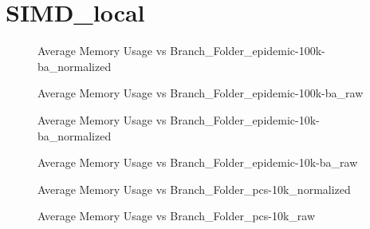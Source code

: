 \section{SIMD\_local}
\begin{figure}[H]
\centering

\caption{Average Memory Usage vs Branch\_Folder\_epidemic-100k-ba\_normalized}
\end{figure}
\vspace{1cm}
\begin{figure}[H]
\centering

\caption{Average Memory Usage vs Branch\_Folder\_epidemic-100k-ba\_raw}
\end{figure}
\vspace{1cm}
\newpage
\begin{figure}[H]
\centering

\caption{Average Memory Usage vs Branch\_Folder\_epidemic-10k-ba\_normalized}
\end{figure}
\vspace{1cm}
\begin{figure}[H]
\centering

\caption{Average Memory Usage vs Branch\_Folder\_epidemic-10k-ba\_raw}
\end{figure}
\vspace{1cm}
\newpage
\begin{figure}[H]
\centering

\caption{Average Memory Usage vs Branch\_Folder\_pcs-10k\_normalized}
\end{figure}
\vspace{1cm}
\begin{figure}[H]
\centering

\caption{Average Memory Usage vs Branch\_Folder\_pcs-10k\_raw}
\end{figure}
